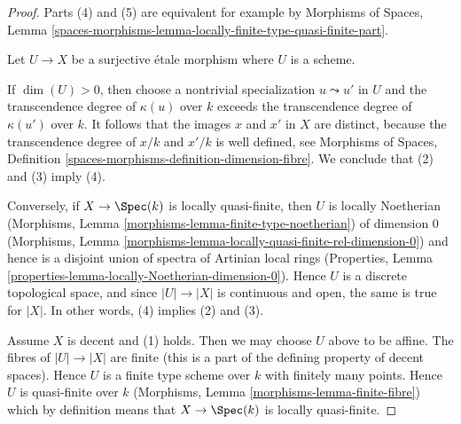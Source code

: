 \begin{proof}
Parts (4) and (5) are equivalent for example by
Morphisms of Spaces, Lemma
\ref{spaces-morphisms-lemma-locally-finite-type-quasi-finite-part}.

\medskip\noindent
Let $U \to X$ be a surjective \'etale morphism where $U$ is a scheme.

\medskip\noindent
If $\dim(U) > 0$, then choose a nontrivial specialization
$u \leadsto u'$ in $U$ and the transcendence degree of $\kappa(u)$
over $k$ exceeds the transcendence degree of $\kappa(u')$ over $k$.
It follows that the images $x$ and $x'$ in $X$ are distinct, because
the transcendence degree of $x/k$ and $x'/k$ is well defined, see
Morphisms of Spaces, Definition
\ref{spaces-morphisms-definition-dimension-fibre}.
We conclude that (2) and (3) imply (4).

\medskip\noindent
Conversely, if $X \to \Spec(k)$ is locally quasi-finite, then $U$ is
locally Noetherian
(Morphisms, Lemma \ref{morphisms-lemma-finite-type-noetherian})
of dimension $0$
(Morphisms, Lemma \ref{morphisms-lemma-locally-quasi-finite-rel-dimension-0})
and hence is a disjoint union of spectra of Artinian local rings
(Properties, Lemma \ref{properties-lemma-locally-Noetherian-dimension-0}).
Hence $U$ is a discrete topological space, and since $|U| \to |X|$
is continuous and open, the same is true for $|X|$.
In other words, (4) implies (2) and (3).

\medskip\noindent
Assume $X$ is decent and (1) holds. Then we may choose $U$ above to
be affine. The fibres of $|U| \to |X|$ are finite (this is a part of the
defining property of decent spaces). Hence $U$ is a finite type scheme
over $k$ with finitely many points. Hence $U$ is quasi-finite over $k$
(Morphisms, Lemma \ref{morphisms-lemma-finite-fibre})
which by definition means that $X \to \Spec(k)$ is locally quasi-finite.
\end{proof}

